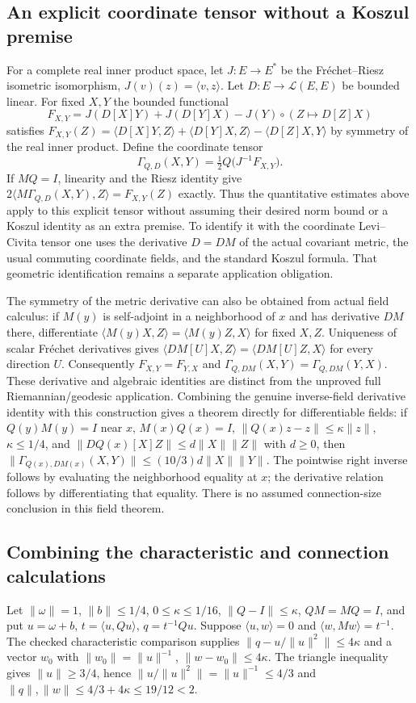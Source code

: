 \documentclass[11pt]{article}
\theoremstyle{definition}
\theoremstyle{remark}
\numberwithin{equation}{section}
\begin{document}
\subsection{An explicit coordinate tensor without a Koszul premise}\label{connection-formal:coordinate}\label{connection-formal:symmetry}\label{connection-formal:actual-fields}
For a complete real inner product space, let $J:E\to E^*$ be the
Fr\'echet--Riesz isometric isomorphism, $J(v)(z)=\langle v,z\rangle$.
Let $D:E\to\mathcal L(E,E)$ be bounded linear. For fixed $X,Y$ the
bounded functional
\[
 F_{X,Y}=J(D[X]Y)+J(D[Y]X)-J(Y)\circ (Z\mapsto D[Z]X)
\]
satisfies $F_{X,Y}(Z)=\langle D[X]Y,Z\rangle+
\langle D[Y]X,Z\rangle-\langle D[Z]X,Y\rangle$ by symmetry of the
real inner product. Define the coordinate tensor
\[
 \Gamma_{Q,D}(X,Y)=\tfrac12 Q\big(J^{-1}F_{X,Y}\big).
\]
If $MQ=I$, linearity and the Riesz identity give
$2\langle M\Gamma_{Q,D}(X,Y),Z\rangle=F_{X,Y}(Z)$ exactly.
Thus the quantitative estimates above apply to this explicit tensor without
assuming their desired norm bound or a Koszul identity as an extra premise.
To identify it with the coordinate Levi--Civita tensor one uses the derivative
$D=DM$ of the actual covariant metric, the usual commuting coordinate fields,
and the standard Koszul formula. That geometric identification remains a
separate application obligation.

The symmetry of the metric derivative can also be obtained from actual field
calculus: if $M(y)$ is self-adjoint in a neighborhood of $x$ and has derivative
$DM$ there, differentiate
$\langle M(y)X,Z\rangle=\langle M(y)Z,X\rangle$ for fixed $X,Z$.
Uniqueness of scalar Fr\'echet derivatives gives
$\langle DM[U]X,Z\rangle=\langle DM[U]Z,X\rangle$ for every direction $U$.
Consequently $F_{X,Y}=F_{Y,X}$ and $\Gamma_{Q,DM}(X,Y)=
\Gamma_{Q,DM}(Y,X)$. These derivative and algebraic identities are distinct
from the unproved full Riemannian/geodesic application.
Combining the genuine inverse-field derivative identity with this construction
gives a theorem directly for differentiable fields: if $Q(y)M(y)=I$ near $x$,
$M(x)Q(x)=I$, $\|Q(x)z-z\|\le\kappa\|z\|$, $\kappa\le1/4$, and
$\|DQ(x)[X]Z\|\le d\|X\|\|Z\|$ with $d\ge0$, then
$\|\Gamma_{Q(x),DM(x)}(X,Y)\|\le(10/3)d\|X\|\|Y\|$.
The pointwise right inverse follows by evaluating the neighborhood equality
at $x$; the derivative relation follows by differentiating that equality.
There is no assumed connection-size conclusion in this field theorem.
\subsection{Combining the characteristic and connection calculations}\label{connection-formal:vector-norms}\label{connection-formal:hessian}
Let $\|\omega\|=1$, $\|b\|\le1/4$, $0\le\kappa\le1/16$,
$\|Q-I\|\le\kappa$, $QM=MQ=I$, and put $u=\omega+b$,
$t=\langle u,Qu\rangle$, $q=t^{-1}Qu$. Suppose
$\langle u,w\rangle=0$ and $\langle w,Mw\rangle=t^{-1}$.
The checked characteristic comparison supplies
$\|q-u/\|u\|^2\|\le4\kappa$ and a vector $w_0$ with
$\|w_0\|=\|u\|^{-1}$, $\|w-w_0\|\le4\kappa$.
The triangle inequality gives $\|u\|\ge3/4$, hence
$\|u/\|u\|^2\|=\|u\|^{-1}\le4/3$ and
$\|q\|,\|w\|\le4/3+4\kappa\le19/12<2$.
\end{document}
